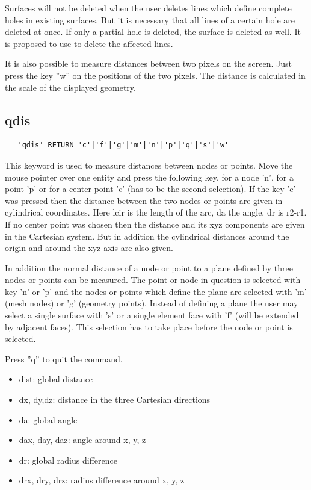 \documentclass{article}
\begin{document}
Surfaces will not be deleted when the user deletes lines which define complete holes in existing surfaces. But it is necessary that all lines of a certain hole are deleted at once. If only a partial hole is deleted, the surface is deleted as well. It is proposed to use  to delete the affected lines. 

It is also possible to measure distances between two pixels on the screen. Just press the key ''w'' on the positions of the two pixels. The distance is calculated in the scale of the displayed geometry.

\subsection{\label{qdis}qdis}
\begin{verbatim}
   'qdis' RETURN 'c'|'f'|'g'|'m'|'n'|'p'|'q'|'s'|'w' 
\end{verbatim}
This keyword is used to measure distances between nodes or points. Move the mouse pointer over one entity and press the following key, for a node 'n', for a point 'p' or for a center point 'c' (has to be the second selection). If the key 'c' was pressed then the distance between the two nodes or points are given in cylindrical coordinates. Here lcir is the length of the arc, da the angle, dr is r2-r1. If no center point was chosen then the distance and its xyz components are given in the Cartesian system. But in addition the cylindrical distances around the origin and around the xyz-axis are also given.

In addition the normal distance of a node or point to a plane defined by three nodes or points can be measured. The point or node in question is selected with key 'n' or 'p' and the nodes or points which define the plane are selected with 'm' (mesh nodes) or 'g' (geometry points). Instead of defining a plane the user may select a single surface with 's' or a single element face with 'f' (will be extended by adjacent faces). This selection has to take place before the node or point is selected.

Press ''q'' to quit the command.

\begin{itemize}
\item dist: global distance
\item dx, dy,dz: distance in the three Cartesian directions
\item da: global angle
\item dax, day, daz: angle around x, y, z
\item dr: global radius difference
\item drx, dry, drz: radius difference around x, y, z
\end{itemize}
\end{document}
